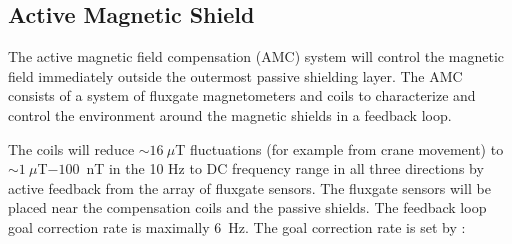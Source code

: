 









\subsection{Active Magnetic Shield}\label{sec:amc}

The active magnetic field compensation (AMC) system will control the magnetic field immediately outside the outermost passive shielding layer. The AMC consists of a system of fluxgate magnetometers and coils to characterize and control the environment around the magnetic shields in a feedback loop. 


The coils will reduce $\sim16~\mu$T fluctuations (for example from crane movement) to $\sim1~\mu$T$-100$~nT in the 10 Hz to DC frequency range in all three directions by active feedback from the array of fluxgate sensors. The fluxgate sensors will be placed near the compensation coils and the passive shields. The feedback loop goal correction rate is maximally 6~Hz. The goal correction rate is set by :

